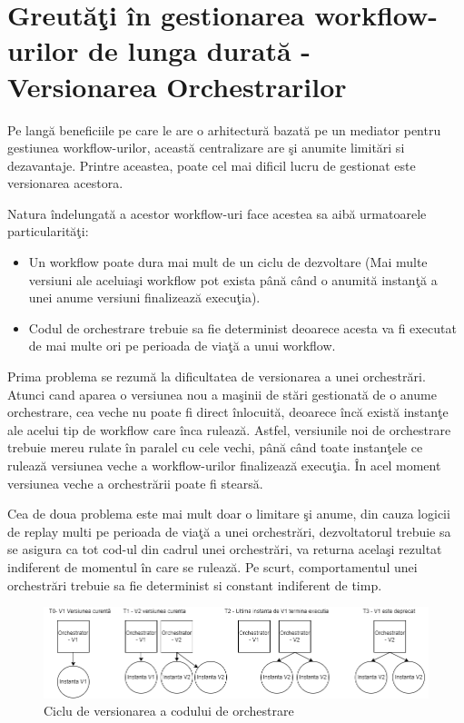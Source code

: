 \documentclass[a4paper,12pt]{report}
\begin{document}
\section {Greutăţi în gestionarea workflow-urilor de lunga durată - Versionarea Orchestrarilor }
\quad Pe langă beneficiile pe care le are o arhitectură bazată pe un mediator pentru gestiunea workflow-urilor, această centralizare are şi anumite limitări si dezavantaje. Printre aceastea, poate cel mai dificil lucru de gestionat este versionarea acestora.
\par Natura îndelungată a acestor workflow-uri face acestea sa aibă urmatoarele particularităţi: 
\begin{itemize}
\item Un workflow poate dura mai mult de un ciclu de dezvoltare (Mai multe versiuni ale aceluiaşi workflow pot exista până când o anumită instanţă a unei anume versiuni finalizează execuţia). 
\item Codul de orchestrare trebuie sa fie determinist deoarece acesta va fi executat de mai multe ori pe perioada de viaţă a unui workflow. 
\end{itemize}
\par Prima problema se rezumă la dificultatea de versionarea a unei orchestrări. Atunci cand aparea o versiunea nou a maşinii de stări gestionată de o anume orchestrare, cea veche nu poate fi direct înlocuită, deoarece încă există instanţe ale acelui tip de workflow care înca rulează. Astfel, versiunile noi de orchestrare trebuie mereu rulate în paralel cu cele vechi, până când toate instanţele ce rulează versiunea veche a workflow-urilor finalizează execuţia. În acel moment versiunea veche a orchestrării poate fi stearsă. 
\par Cea de doua problema este mai mult doar o limitare şi anume, din cauza logicii de replay multi pe perioada de viaţă a unei orchestrări, dezvoltatorul trebuie sa se asigura ca tot cod-ul din cadrul unei orchestrări, va returna acelaşi rezultat indiferent de momentul în care se rulează. Pe scurt, comportamentul unei orchestrări trebuie sa fie determinist si constant indiferent de timp. 
 \begin{figure}[h]
\begin{center}
        \includegraphics[width=1\textwidth]{images/dtf_versioning}
			 \caption{Ciclu de versionarea a codului de orchestrare}
			 \label{fig:dtf-versioning}
\end{center}
\end{figure}
\end{document}
